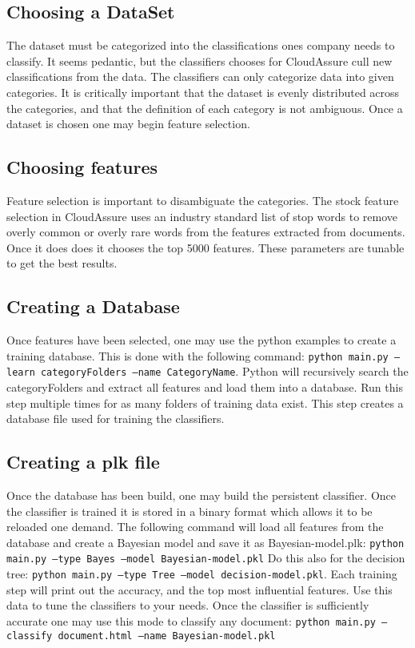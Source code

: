 \subsection{Choosing a DataSet}
The dataset must be categorized into the classifications ones company needs to
classify. It seems pedantic, but the classifiers chooses for CloudAssure cull
new classifications from the data. The classifiers can only categorize data into
given categories. It is critically important that the dataset is evenly distributed across the
categories, and that the definition of each category is not ambiguous. 
Once a dataset is chosen one may begin feature selection.

\subsection{Choosing features}
Feature selection is important to disambiguate the categories. The stock feature
selection in CloudAssure uses an industry standard list of stop words to remove
overly common or overly rare words from the features extracted from documents.
Once it does does it chooses the top 5000 features. These parameters are tunable
 to get the best results.

\subsection{Creating a Database}
Once features have been selected, one may use the python examples to create
a training database. This is done with the following command: 
\texttt{python main.py --learn categoryFolders --name CategoryName}. Python
will recursively search the categoryFolders and extract all features and load
them into a database. Run this step multiple times for as many folders of
training data exist. This step creates a database file used for training the
classifiers.

\subsection{Creating a plk file}
Once the database has been build, one may build the persistent classifier. Once
the classifier is trained it is stored in a binary format which allows it to
be reloaded one demand. The following command will load all features from the
database and create a Bayesian model and save it as Bayesian-model.plk: 
\texttt{python main.py --type Bayes --model Bayesian-model.pkl}
Do this also for the decision tree: \texttt{python main.py --type Tree --model
decision-model.pkl}. Each training step will print out the accuracy, and the top
most influential features. Use this data to tune the classifiers to your needs.
Once the classifier is sufficiently accurate one may use this mode to classify
any document: \texttt{python main.py --classify document.html --name Bayesian-model.pkl}


